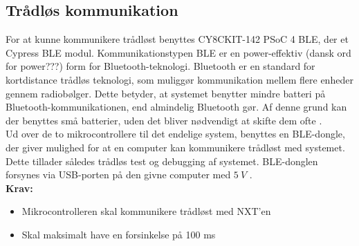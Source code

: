 \subsection{Trådløs kommunikation}
For at kunne kommunikere trådløst benyttes CY8CKIT-142 PSoC 4 BLE, der et Cypress BLE modul. Kommunikationstypen BLE \citep{cypressguide2014} er en power-effektiv (dansk ord for power???) form for Bluetooth-teknologi. Bluetooth er en standard for kortdistance trådløs teknologi, som muliggør kommunikation mellem flere enheder gennem radiobølger. Dette betyder, at systemet benytter mindre batteri på Bluetooth-kommunikationen, end almindelig Bluetooth gør. Af denne grund kan der benyttes små batterier, uden det bliver nødvendigt at skifte dem ofte \citep{gupta2013}. 
\\

Ud over de to mikrocontrollere til det endelige system, benyttes en BLE-dongle, der giver mulighed for at en computer kan kommunikere trådløst med systemet. Dette tillader således trådløs test og debugging af systemet. BLE-donglen forsynes via USB-porten på den givne computer med $5~V$ \citep{cypressguide2014}. 
\\

\textbf{Krav:}
\begin{itemize}
\item Mikrocontrolleren skal kommunikere trådløst med NXT'en 
\item Skal maksimalt have en forsinkelse på 100 ms
\end{itemize}